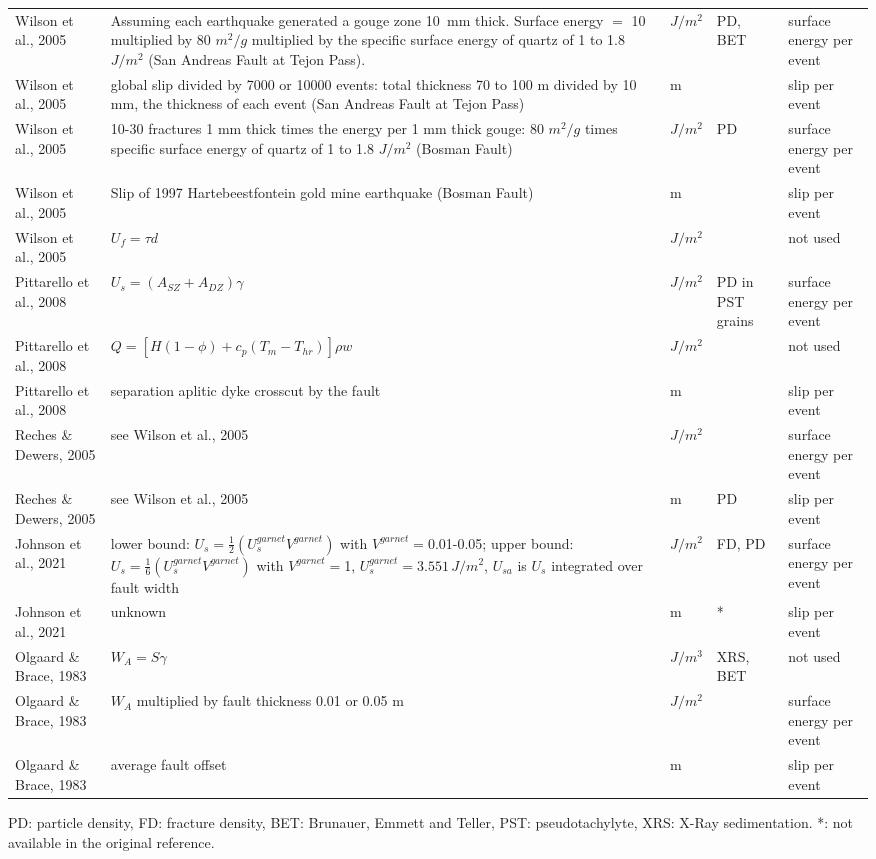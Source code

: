 \documentclass{article}
\begin{document}
\begin{longtable}{|p{4 cm}|p{8 cm}|p{1.25 cm}|p{1.25 cm}|p{1.5 cm}|}
Wilson et al., 2005 & Assuming each earthquake generated a gouge zone 10  mm thick. Surface energy $=$ 10 multiplied by 80 $m^2/g$ multiplied by the specific surface energy of quartz of 1 to 1.8 $J/m^{2}$ (San Andreas Fault at Tejon Pass). & $J/m^2$ & PD, BET & surface energy per event \\
Wilson et al., 2005 & global slip divided by 7000 or 10000 events: total thickness 70 to 100 m divided by 10 mm, the thickness of each event (San Andreas Fault at Tejon Pass) & m & & slip per event \\
Wilson et al., 2005 & 10-30 fractures 1 mm thick times the energy per 1 mm thick gouge: 80 $m^2/g$ times specific surface energy of quartz of 1 to 1.8 $J/m^2$ (Bosman Fault) & $J/m^2$ & PD & surface energy per event \\
Wilson et al., 2005 & Slip of 1997 Hartebeestfontein gold mine earthquake (Bosman Fault) & m & & slip per event \\
Wilson et al., 2005 & \( \displaystyle U_f = \tau d\) & $J/m^2$ & & not used \\
Pittarello et al., 2008 & \( \displaystyle U_s = (A_{SZ} + A_{DZ}) \gamma \) & $J/m^2$ & PD in PST grains & surface energy per event \\
Pittarello et al., 2008 & \( \displaystyle Q = [H(1-\phi) + c_p (T_m - T_{hr})] \rho w   \) & $J/m^2$ & & not used \\
Pittarello et al., 2008 & separation aplitic dyke crosscut by the fault & m & & slip per event \\
Reches \& Dewers, 2005 & see Wilson et al., 2005 & $J/m^2$ & & surface energy per event \\
Reches \& Dewers, 2005 & see Wilson et al., 2005 & m & PD & slip per event \\
Johnson et al., 2021 & lower bound: \( \displaystyle U_s=\frac{1}{2} \left ( U_s^{garnet} V^{garnet} \right )\) with $V^{garnet}=$0.01-0.05; upper bound: \( \displaystyle U_s=\frac{1}{6} \left ( U_s^{garnet} V^{garnet} \right ) \) with $V^{garnet}=$1, $U_s^{garnet} = 3.551\,J/m^2$, $U_{sa}$ is $U_s$ integrated over fault width & $J/m^2$ & FD, PD & surface energy per event \\
Johnson et al., 2021 & unknown & m & * & slip per event \\
Olgaard \& Brace, 1983 & \( \displaystyle W_A = S \gamma\) & $J/m^3$ & XRS, BET & not used \\
Olgaard \& Brace, 1983 & $W_A$ multiplied by fault thickness 0.01 or 0.05 m & $J/m^2$ & & surface energy per event \\
Olgaard \& Brace, 1983 & average fault offset & m & & slip per event \\

\hline
\end{longtable}
PD: particle density, FD: fracture density, BET: Brunauer, Emmett and Teller, PST: pseudotachylyte, XRS: X-Ray sedimentation.
*: not available in the original reference.
\end{document}
